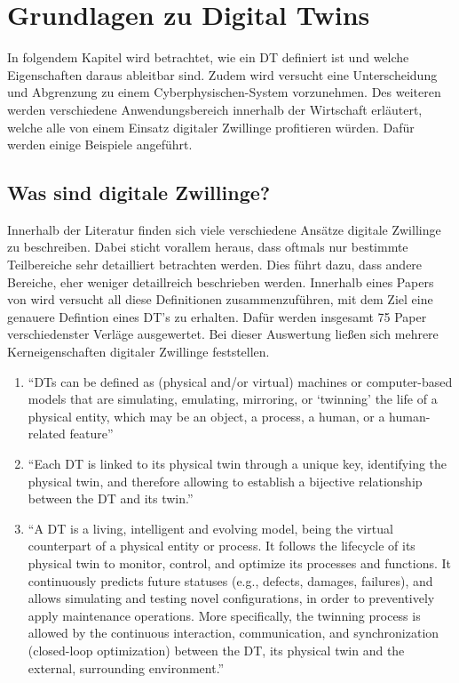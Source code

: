 \chapter{Grundlagen zu Digital Twins}

In folgendem Kapitel wird betrachtet, wie ein \ac{DT} definiert ist und welche Eigenschaften daraus ableitbar sind. Zudem wird versucht eine Unterscheidung und Abgrenzung zu einem Cyberphysischen-System vorzunehmen. Des weiteren werden verschiedene Anwendungsbereich innerhalb der Wirtschaft erläutert, welche alle von einem Einsatz digitaler Zwillinge profitieren würden. Dafür werden einige Beispiele angeführt.

\section{Was sind digitale Zwillinge?}

Innerhalb der Literatur finden sich viele verschiedene Ansätze digitale Zwillinge zu beschreiben. Dabei sticht vorallem heraus, dass oftmals nur bestimmte Teilbereiche sehr detailliert betrachten werden. Dies  führt dazu, dass andere Bereiche, eher weniger detaillreich beschrieben werden. Innerhalb eines Papers von \citeauthor{barricelli2019survey} wird versucht all diese Definitionen zusammenzuführen, mit dem Ziel eine genauere Defintion eines \ac{DT}'s zu erhalten. Dafür werden insgesamt 75 Paper verschiedenster Verläge ausgewertet.\autocite[S. 4, Kapitel 4]{barricelli2019survey} Bei dieser Auswertung ließen sich mehrere Kerneigenschaften digitaler Zwillinge feststellen.

\begin{enumerate}
    \item \enquote{\ac{DT}s can be deﬁned as (physical and/or virtual) machines or computer-based models that are simulating, emulating, mirroring, or \enquote{twinning} the life of a physical entity, which may be an object, a process, a human, or a human-related feature}
    \item \enquote{Each DT is linked to its physical twin through a unique key, identifying the physical twin, and therefore allowing to establish a bijective relationship between the DT and its twin.}
    \item \enquote{A DT is a living, intelligent and evolving model, being the virtual counterpart of a physical entity or process. It follows the lifecycle of its physical twin to monitor, control, and optimize its processes and functions. It continuously predicts future statuses (e.g., defects, damages, failures), and allows simulating and testing novel conﬁgurations, in order to preventively apply maintenance operations. More speciﬁcally, the twinning process is allowed by the continuous interaction, communication, and synchronization (closed-loop optimization) between the DT, its physical twin and the external, surrounding environment.}
\end{enumerate}

